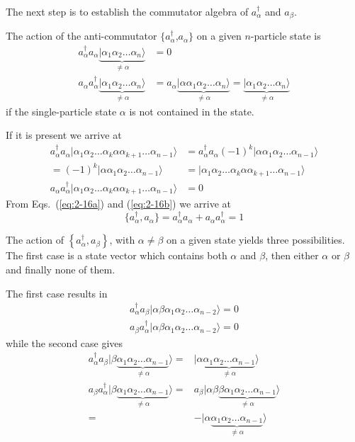 The next step is to establish the  commutator algebra of $a_\alpha^{\dagger}$ and
$a_\beta$. 

The action of the anti-commutator 
$\{a_\alpha^{\dagger}$,$a_\alpha\}$ on a given $n$-particle state is
\begin{align}
	a_\alpha^{\dagger} a_\alpha \underbrace{|\alpha_1\alpha_2 \dots \alpha_{n}\rangle}_{\neq \alpha} &= 0 \nonumber \\
	a_\alpha a_\alpha^{\dagger} \underbrace{|\alpha_1\alpha_2 \dots \alpha_{n}\rangle}_{\neq \alpha} &=
	a_\alpha \underbrace{|\alpha \alpha_1\alpha_2 \dots \alpha_{n}\rangle}_{\neq \alpha} = 
	\underbrace{|\alpha_1\alpha_2 \dots \alpha_{n}\rangle}_{\neq \alpha} \label{eq:2-16a}
\end{align}
if the single-particle state $\alpha$ is not contained in the state.

 If it is present
we arrive at
\begin{align}
	a_\alpha^{\dagger} a_\alpha |\alpha_1\alpha_2 \dots \alpha_{k}\alpha \alpha_{k+1} \dots \alpha_{n-1}\rangle &=
	a_\alpha^{\dagger} a_\alpha (-1)^k |\alpha \alpha_1\alpha_2 \dots \alpha_{n-1}\rangle \nonumber \\
	= (-1)^k |\alpha \alpha_1\alpha_2 \dots \alpha_{n-1}\rangle &=
	|\alpha_1\alpha_2 \dots \alpha_{k}\alpha \alpha_{k+1} \dots \alpha_{n-1}\rangle \nonumber \\
	a_\alpha a_\alpha^{\dagger}|\alpha_1\alpha_2 \dots \alpha_{k}\alpha \alpha_{k+1} \dots \alpha_{n-1}\rangle &= 0 \label{eq:2-16b}
\end{align}
From Eqs.~(\ref{eq:2-16a}) and  (\ref{eq:2-16b}) we arrive at 
\begin{equation}
	\{a_\alpha^{\dagger} , a_\alpha \} = a_\alpha^{\dagger} a_\alpha + a_\alpha a_\alpha^{\dagger} = 1 \label{eq:2-17}
\end{equation}

The action of $\left\{a_\alpha^{\dagger}, a_\beta\right\}$, with 
$\alpha \ne \beta$ on a given state yields three possibilities. 
The first case is a state vector which contains both $\alpha$ and $\beta$, then either 
$\alpha$ or $\beta$ and finally none of them.

The first case results in
\begin{align}
	a_\alpha^{\dagger} a_\beta |\alpha\beta\alpha_1\alpha_2 \dots \alpha_{n-2}\rangle = 0 \nonumber \\
	a_\beta a_\alpha^{\dagger} |\alpha\beta\alpha_1\alpha_2 \dots \alpha_{n-2}\rangle = 0 \label{eq:2-18a}
\end{align}
while the second case gives
\begin{align}
	 a_\alpha^{\dagger} a_\beta |\beta \underbrace{\alpha_1\alpha_2 \dots \alpha_{n-1}}_{\neq \alpha}\rangle =& 
	 	|\alpha \underbrace{\alpha_1\alpha_2 \dots \alpha_{n-1}}_{\neq  \alpha}\rangle \nonumber \\
	a_\beta a_\alpha^{\dagger} |\beta \underbrace{\alpha_1\alpha_2 \dots \alpha_{n-1}}_{\neq \alpha}\rangle =&
		a_\beta |\alpha\beta\underbrace{\beta \alpha_1\alpha_2 \dots \alpha_{n-1}}_{\neq \alpha}\rangle \nonumber \\
	=& - |\alpha\underbrace{\alpha_1\alpha_2 \dots \alpha_{n-1}}_{\neq \alpha}\rangle \label{eq:2-18b}
\end{align}

